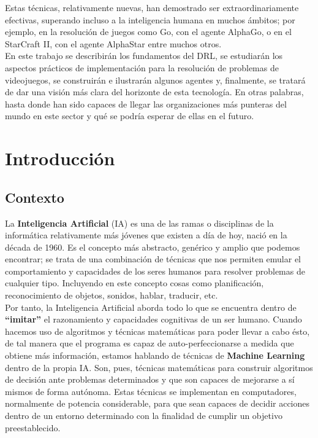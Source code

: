 \documentclass[11pt,fleqn]{book} %
\begin{document}
Estas técnicas, relativamente nuevas, han demostrado ser extraordinariamente efectivas, superando incluso a la inteligencia humana en muchos ámbitos; por ejemplo, en la resolución de juegos como Go, con el agente AlphaGo, o en el StarCraft II, con el agente AlphaStar entre muchos otros. \\

En este trabajo se describirán los fundamentos del DRL, se estudiarán los aspectos prácticos de implementación para la resolución de problemas de videojuegos, se construirán e ilustrarán algunos agentes y, finalmente, se tratará de dar una visión más clara del horizonte de esta tecnología. En otras palabras, hasta donde han sido capaces de llegar las organizaciones más punteras del mundo en este sector y qué se podría esperar de ellas en el futuro.

\part{Introducción}

\usechapterimagetrue
{} %

\chapter{Contexto}\label{sec:introduccion}

La \textbf{Inteligencia Artificial} (IA) es una de las ramas o disciplinas de la informática relativamente más jóvenes que existen a día de hoy, nació en la década de 1960. Es el concepto más abstracto, genérico y amplio que podemos encontrar; se trata de una combinación de técnicas que nos permiten emular el comportamiento y capacidades de los seres humanos para resolver problemas de cualquier tipo. Incluyendo en este concepto cosas como planificación, reconocimiento de objetos, sonidos, hablar, traducir, etc.\cite{article:IA} \\

Por tanto, la Inteligencia Artificial aborda todo lo que se encuentra dentro de \textbf{``imitar''} el razonamiento y capacidades cognitivas de un ser humano. Cuando hacemos uso de algoritmos y técnicas matemáticas para poder llevar a cabo ésto, de tal manera que el programa es capaz de auto-perfeccionarse a medida que obtiene más información, estamos hablando de técnicas de \textbf{Machine Learning} dentro de la propia IA. Son, pues, técnicas matemáticas para construir algoritmos de decisión ante problemas determinados y que son capaces de mejorarse a sí mismos de forma autónoma. Estas técnicas se implementan en computadores, normalmente de potencia considerable, para que sean capaces de decidir acciones dentro de un entorno determinado con la finalidad de cumplir un objetivo preestablecido. \\
\end{document}
